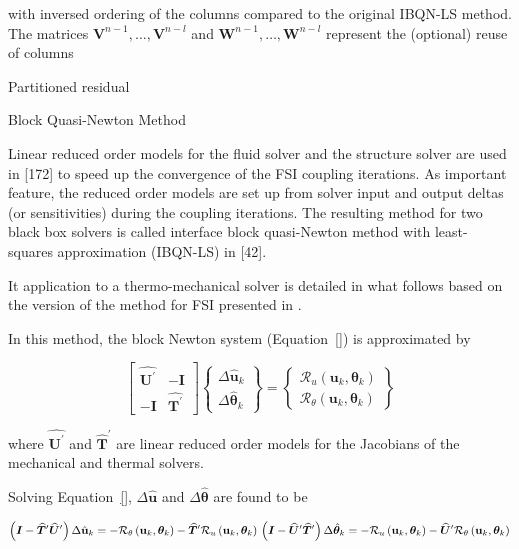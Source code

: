 with inversed ordering of the columns compared to the original IBQN-LS method. The matrices \(\boldsymbol{V}^{n-1}, \ldots, \boldsymbol{V}^{n-l}\) and \(\boldsymbol{W}^{n-1}, \ldots, \boldsymbol{W}^{n-l}\) represent the (optional) reuse of columns

 Partitioned residual

 Block Quasi-Newton Method

Linear reduced order models for the fluid solver and the structure solver are used in [172] to speed up the convergence of the FSI coupling iterations. As important feature, the reduced order models are set up from solver input and output deltas (or sensitivities) during the coupling iterations. The resulting method for two black box solvers is called interface block quasi-Newton method with least-squares approximation (IBQN-LS) in [42].

It application to a thermo-mechanical solver is detailed in what follows based on the version of the method for FSI presented in \cite{gatzhammer}.

In this method, the block Newton system (Equation~\eqref{}) is approximated by

$$
\left[\begin{array}{cc}
\widehat{\boldsymbol{U}^{\prime}} & -\boldsymbol{I} \\
-\boldsymbol{I} & \widehat{\boldsymbol{T}^{\prime}}
\end{array}\right]\left\{\begin{array}{c}
\Delta \hat{\mathbf{u}}_k \\
\Delta \hat{\boldsymbol{\theta}}_k
\end{array}\right\}=\left\{\begin{array}{l}
\mathcal{R}_{u}(\mathbf{u}_k, \boldsymbol{\theta}_k) \\
\mathcal{R}_{\theta}(\mathbf{u}_k, \boldsymbol{\theta}_k)
\end{array}\right\}
$$

where $\widehat{\boldsymbol{U}^{\prime}}$ and $\widehat{\boldsymbol{T}}^{\prime}$ are linear reduced order models for the Jacobians of the mechanical and thermal solvers.

Solving Equation~\eqref{}, $\Delta\hat{\mathbf u}$ and $\Delta \hat{\boldsymbol \theta}$  are found to be

$$
\left(\boldsymbol{I}-\widehat{\boldsymbol{T}}^{\prime} \widehat{\boldsymbol{U}}^{\prime}\right) \Delta \hat{\mathbf{u}}_k=-\mathcal{R}_{\theta}\left(\mathbf{u}_k, \boldsymbol{\theta}_k\right)-\widehat{\boldsymbol{T}}^{\prime} \mathcal{R}_{u}\left(\mathbf{u}_k, \boldsymbol{\theta}_k\right)\\
\left(\boldsymbol{I}-\widehat{\boldsymbol{U}}^{\prime} \widehat{\boldsymbol{T}}^{\prime}\right) \Delta \hat{\boldsymbol{\theta}}_k=-\mathcal{R}_{u}\left(\mathbf{u}_k, \boldsymbol{\theta}_k\right)-\widehat{\boldsymbol{U}}^{\prime} \mathcal{R}_{\theta}\left(\mathbf{u}_k, \boldsymbol{\theta}_k\right)
$$

